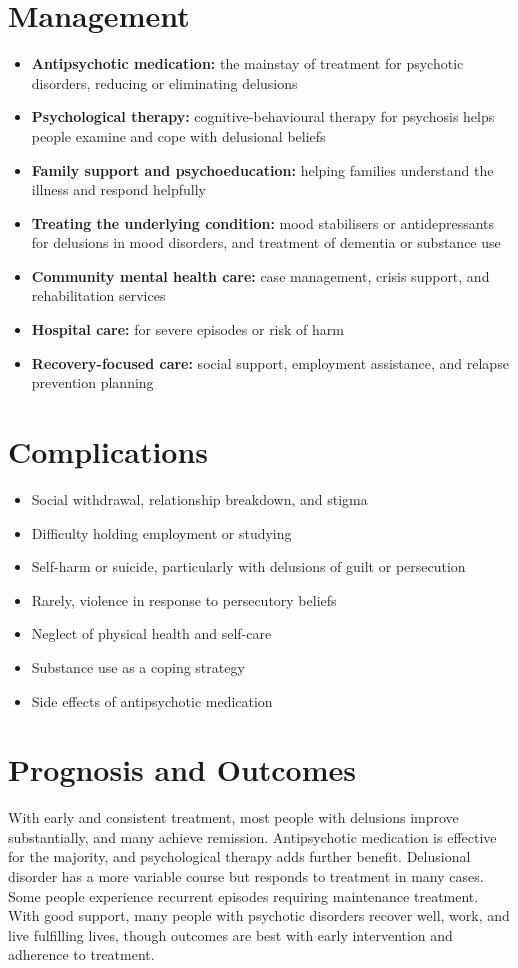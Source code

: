 \section*{Management}
\begin{itemize}
    \item \textbf{Antipsychotic medication:} the mainstay of treatment for psychotic disorders, reducing or eliminating delusions
    \item \textbf{Psychological therapy:} cognitive-behavioural therapy for psychosis helps people examine and cope with delusional beliefs
    \item \textbf{Family support and psychoeducation:} helping families understand the illness and respond helpfully
    \item \textbf{Treating the underlying condition:} mood stabilisers or antidepressants for delusions in mood disorders, and treatment of dementia or substance use
    \item \textbf{Community mental health care:} case management, crisis support, and rehabilitation services
    \item \textbf{Hospital care:} for severe episodes or risk of harm
    \item \textbf{Recovery-focused care:} social support, employment assistance, and relapse prevention planning
\end{itemize}

\section*{Complications}
\begin{itemize}
    \item Social withdrawal, relationship breakdown, and stigma
    \item Difficulty holding employment or studying
    \item Self-harm or suicide, particularly with delusions of guilt or persecution
    \item Rarely, violence in response to persecutory beliefs
    \item Neglect of physical health and self-care
    \item Substance use as a coping strategy
    \item Side effects of antipsychotic medication
\end{itemize}

\section*{Prognosis and Outcomes}
With early and consistent treatment, most people with delusions improve substantially, and many achieve remission. Antipsychotic medication is effective for the majority, and psychological therapy adds further benefit. Delusional disorder has a more variable course but responds to treatment in many cases. Some people experience recurrent episodes requiring maintenance treatment. With good support, many people with psychotic disorders recover well, work, and live fulfilling lives, though outcomes are best with early intervention and adherence to treatment.


